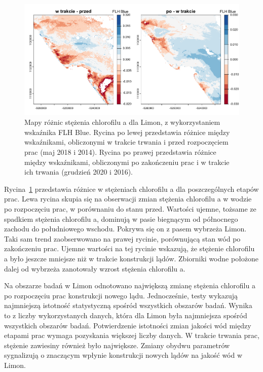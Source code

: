\documentclass{amuthesis}
\begin{document}
\begin{figure}[t]

{\centering \includegraphics[width=6.25in,height=\textheight]{figures/costarica/flhblue_diff.png}

}

\caption{\label{fig-cr_flhblue_diff}Mapy różnic stężenia chlorofilu a
dla Limon, z wykorzystaniem wskaźnika FLH Blue. Rycina po lewej
przedstawia różnice między wskaźnikami, obliczonymi w trakcie trwania i
przed rozpoczęciem prac (maj 2018 i 2014). Rycina po prawej przedstawia
różnice między wskaźnikami, obliczonymi po zakończeniu prac i w trakcie
ich trwania (grudzień 2020 i 2016).}

\end{figure}

Rycina~\ref{fig-cr_flhblue_diff} przedstawia różnice w stężeniach
chlorofilu a dla poszczególnych etapów prac. Lewa rycina skupia się na
obserwacji zmian stężenia chlorofilu a w wodzie po rozpoczęciu prac, w
porównaniu do stanu przed. Wartości ujemne, tożsame ze spadkiem stężenia
chlorofilu a, dominują w pasie biegnącym od północnego zachodu do
południowego wschodu. Pokrywa się on z pasem wybrzeża Limon. Taki sam
trend zaobserwowano na prawej rycinie, porównującą stan wód po
zakończeniu prac. Ujemne wartości na tej rycinie wskazują, że stężenie
chlorofilu a było jeszcze mniejsze niż w trakcie konstrukcji lądów.
Zbiorniki wodne położone dalej od wybrzeża zanotowały wzrost stężenia
chlorofilu a.

Na obszarze badań w Limon odnotowano największą zmianę stężenia
chlorofilu a po rozpoczęciu prac konstrukcji nowego lądu. Jednocześnie,
testy wykazują najmniejszą istotność statystyczną spośród wszystkich
obszarów badań. Wynika to z liczby wykorzystanych danych, która dla
Limon była najmniejsza spośród wszystkich obszarów badań. Potwierdzenie
istotności zmian jakości wód między etapami prac wymaga pozyskania
większej liczby danych. W trakcie trwania prac, stężenie zawiesiny
również było największe. Zmiany obydwu parametrów sygnalizują o
znaczącym wpłynie konstrukcji nowych lądów na jakość wód w Limon.
\end{document}
